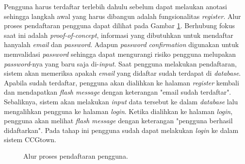 Pengguna harus terdaftar terlebih dahulu sebelum dapat melaukan anotasi sehingga
langkah awal yang harus dibangun adalah fungsionalitas \textit{register}.
Alur proses pendaftaran pengguna dapat dilihat pada Gambar \ref{flowchart:register}.
Berhubung fokus saat ini adalah \textit{proof-of-concept}, informasi yang dibutuhkan
untuk mendaftar hanyalah \textit{email} dan \textit{password}. Adapun
\textit{password confirmation} digunakan untuk memvalidasi \textit{password}
sehingga dapat mengurangi risiko pengguna melupakan
\textit{password}-nya yang baru saja di-\textit{input}.
Saat pengguna melakukan pendaftaran, sistem akan memeriksa apakah \textit{email} yang
didaftar sudah terdapat di \textit{database}.
Apabila sudah terdaftar, pengguna akan dialihkan ke halaman \textit{register} kembali
dan mendapatkan \textit{flash message} dengan keterangan "email sudah terdaftar".
Sebaliknya, sistem akan melakukan \textit{input} data tersebut ke dalam \textit{database}
lalu mengalihkan pengguna ke halaman \textit{login}.
Ketika dialihkan ke halaman \textit{login}, pengguna akan melihat \textit{flash message}
dengan keterangan "pengguna berhasil didaftarkan".
Pada tahap ini pengguna sudah dapat melakukan \textit{login} ke dalam sistem CCGtown.

\begin{figure}\centering\small
	\caption{Alur proses pendaftaran pengguna.}
  \label{flowchart:register}
\end{figure}


